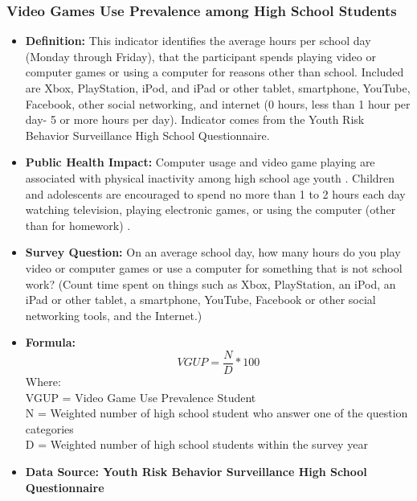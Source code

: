 \documentclass[12pt,letterpaper]{report}
\begin{document}
		\subsubsection{Video Games Use Prevalence among High School Students} 
	\begin{itemize}
		\item \textbf{Definition:} This indicator identifies the average hours per school day (Monday through Friday), that the participant spends playing video or computer games or using a computer for reasons other than school. Included are Xbox, PlayStation, iPod, and iPad or other tablet, smartphone, YouTube, Facebook, other social networking, and internet (0 hours, less than 1 hour per day- 5 or more hours per day). Indicator comes from the Youth Risk Behavior Surveillance High School Questionnaire.
		\item \textbf{Public Health Impact:} Computer usage and video game playing are associated with physical inactivity among high school age youth \cite{fotheringham2000computer}. Children and adolescents are encouraged to spend no more than 1 to 2 hours each day watching television, playing electronic games, or using the computer (other than for homework) \cite{DietaryGuidelines2010}. 
		\item \textbf{Survey Question:} On an average school day, how many hours do you play video or computer games or use a computer for something that is not school work? (Count time spent on things such as Xbox, PlayStation, an iPod, an iPad or other tablet, a smartphone, YouTube, Facebook or other social networking tools, and the Internet.)

		\item \textbf{Formula:} 
			\begin{equation}
				VGUP = \frac{N}{D} *100
			\end{equation}
Where: \\
			VGUP = Video Game Use Prevalence Student \\
			
			N = Weighted number of high school student who answer one of the question categories \\
			
			D = Weighted number of high school students within the survey year \\
			
		\item \textbf{Data Source: Youth Risk Behavior Surveillance High School Questionnaire}
	\end{itemize}
\end{document}
